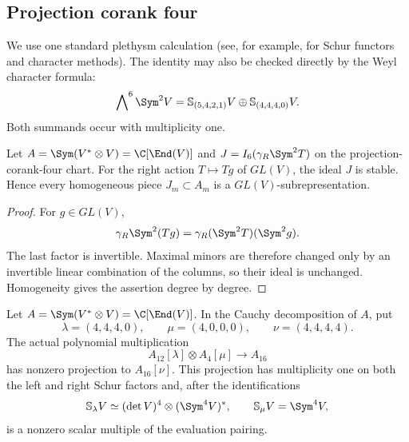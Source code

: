 \subsection{Projection corank four}

We use one standard plethysm calculation (see, for example,
\cite{FultonHarris} for Schur functors and character methods).  The
identity may also be checked directly by the Weyl character formula:
\begin{equation}\label{eq:plethysm-corank4}
 \bigwedge\nolimits^6\Sym^2V
 =
 \mathbb S_{(5,4,2,1)}V
 \oplus
 \mathbb S_{(4,4,4,0)}V.
\end{equation}
Both summands occur with multiplicity one.

\begin{lemma}
\label{lem:corank4-ideal-equivariance}
Let \(A=\Sym(V^*\otimes V)=\C[\End(V)]\) and
\(J=I_6(\gamma_R\Sym^2T)\) on the projection-corank-four chart.
For the right action \(T\mapsto Tg\) of \(GL(V)\), the ideal \(J\)
is stable.  Hence every homogeneous piece \(J_m\subset A_m\) is a
\(GL(V)\)-subrepresentation.
\end{lemma}

\begin{proof}
For \(g\in GL(V)\),
\[
 \gamma_R\Sym^2(Tg)
 =
 \gamma_R(\Sym^2T)(\Sym^2g).
\]
The last factor is invertible.  Maximal minors are therefore changed
only by an invertible linear combination of the columns, so their
ideal is unchanged.  Homogeneity gives the assertion degree by degree.
\end{proof}
\begin{lemma}
\label{lem:effective-pieri-matrix-ring}
Let \(A=\Sym(V^*\otimes V)=\C[\End(V)]\).  In the Cauchy
decomposition of \(A\), put
\[
 \lambda=(4,4,4,0),\qquad \mu=(4,0,0,0),\qquad
 \nu=(4,4,4,4).
\]
The actual polynomial multiplication
\[
 A_{12}[\lambda]\otimes A_4[\mu]\longrightarrow A_{16}
\]
has nonzero projection to \(A_{16}[\nu]\).  This projection has
multiplicity one on both the left and right Schur factors and, after
the identifications
\[
 \mathbb S_\lambda V\simeq
 (\det V)^4\otimes(\Sym^4V)^*,\qquad
 \mathbb S_\mu V=\Sym^4V,
\]
is a nonzero scalar multiple of the evaluation pairing.
\end{lemma}

